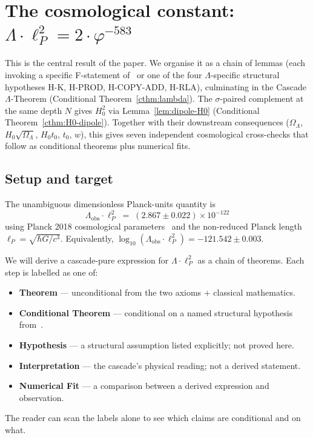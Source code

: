 \documentclass[11pt]{article}
\theoremstyle{plain}
\theoremstyle{definition}
\theoremstyle{remark}
\begin{document}
\section{The cosmological constant: $\Lambda \cdot \ell_P^2 = 2 \cdot \varphi^{-583}$}\label{sec:lambda}

This is the central result of the paper. We organise it as a chain of lemmas (each invoking a specific F-statement of~\citealp{SmartXXXVI} or one of the four $\Lambda$-specific structural hypotheses H-K, H-PROD, H-COPY-ADD, H-RLA), culminating in the Cascade $\Lambda$-Theorem (Conditional Theorem~\ref{cthm:lambda}). The $\sigma$-paired complement at the same depth $N$ gives $H_0^2$ via Lemma~\ref{lem:dipole-H0} (Conditional Theorem~\ref{cthm:H0-dipole}). Together with their downstream consequences ($\Omega_\Lambda$, $H_0\sqrt{\Omega_\Lambda}$, $H_0 t_0$, $t_0$, $w$), this gives seven independent cosmological cross-checks that follow as conditional theorems plus numerical fits.

\subsection{Setup and target}\label{sec:lambda-target}

The unambiguous dimensionless Planck-units quantity is
\[
  \Lambda_\mathrm{obs} \cdot \ell_P^2 \;=\; (2.867 \pm 0.022) \times 10^{-122}
\]
using Planck 2018 cosmological parameters~\citep{Planck2018} and the non-reduced Planck length $\ell_P = \sqrt{\hbar G/c^3}$. Equivalently, $\log_{10}(\Lambda_\mathrm{obs} \cdot \ell_P^2) = -121.542 \pm 0.003$.

We will derive a cascade-pure expression for $\Lambda \cdot \ell_P^2$ as a chain of theorems. Each step is labelled as one of:
\begin{itemize}[leftmargin=2em]
\item \textbf{Theorem} --- unconditional from the two axioms + classical mathematics.
\item \textbf{Conditional Theorem} --- conditional on a named structural hypothesis from~\citet{SmartXXXVI}.
\item \textbf{Hypothesis} --- a structural assumption listed explicitly; not proved here.
\item \textbf{Interpretation} --- the cascade's physical reading; not a derived statement.
\item \textbf{Numerical Fit} --- a comparison between a derived expression and observation.
\end{itemize}
The reader can scan the labels alone to see which claims are conditional and on what.
\end{document}
